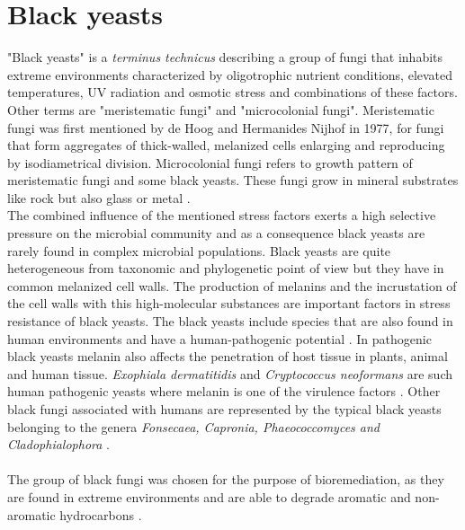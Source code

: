 \documentclass[12pt, a4paper]{report}
\begin{document}
\section{Black yeasts} 
"Black yeasts" is a \textit{terminus technicus} describing a group of fungi that inhabits extreme environments characterized by oligotrophic nutrient conditions, elevated temperatures, UV radiation and osmotic stress and combinations of these factors. Other terms are "meristematic fungi" and "microcolonial fungi".
Meristematic fungi was first mentioned by de Hoog and Hermanides Nijhof in 1977, for fungi that form aggregates of thick-walled, melanized cells enlarging and reproducing by isodiametrical division. Microcolonial fungi refers to growth pattern of meristematic fungi and some black yeasts. These fungi grow in mineral substrates like rock but also glass or metal \cite{Sterflinger2006}. \\
The combined influence of the mentioned stress factors exerts a high selective pressure on the microbial community and as a consequence black yeasts are rarely found in complex microbial populations. Black yeasts are quite heterogeneous from taxonomic and phylogenetic point of view but they have in common melanized cell walls. The production of melanins and the incrustation of the cell walls with this high-molecular substances are important factors in stress resistance of black yeasts. The black yeasts include species that are also found in human environments and have a human-pathogenic potential \cite{Sterflinger2006}. In pathogenic black yeasts melanin also affects the penetration of host tissue in plants, animal and human tissue. \textit{Exophiala dermatitidis} and \textit{Cryptococcus neoformans} are such human pathogenic yeasts where melanin is one of the virulence factors \cite{Hoog2003, Sterflinger2006}. Other black fungi associated with humans are represented by the typical black yeasts belonging to the genera \textit{Fonsecaea, Capronia, Phaeococcomyces and Cladophialophora} \cite{Blasi2015}. \\
\ \\
The group of black fungi was chosen for the purpose of bioremediation, as they are found in extreme environments and  are able to degrade aromatic and non-aromatic hydrocarbons \cite{Poyntner2014} . 
\end{document}

